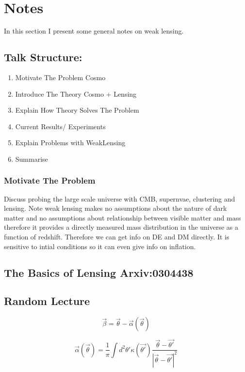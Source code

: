 \section{Notes}
In this section I present some general notes on weak lensing. 

\subsection{Talk Structure:}
\begin{enumerate}
    \item Motivate The Problem Cosmo
    \item Introduce The Theory Cosmo + Lensing
    \item Explain How Theory Solves The Problem
    \item Current Results/ Experiments
    \item Explain Problems with WeakLensing
    \item Summarise
\end{enumerate}

\subsubsection{Motivate The Problem}
Discuss probing the large scale universe with CMB, supernvae, clustering
and lensing. 
Note weak lensing makes no assumptions about the nature of dark matter
and no assumptions about relationship between visible matter and mass therefore
it provides a directly measured mass distribution in the universe as a function of 
redshift. Therefore we can get info on DE and DM directly. It is sensitive to intial
conditions so it can even give info on inflation. 

\subsection{The Basics of Lensing Arxiv:0304438}



\subsection{Random Lecture}
\begin{equation}
    \vec{\beta} = \vec{\theta} - \vec{\alpha}(\vec{\theta})
\end{equation}

\begin{equation}
  \vec{\alpha}(\vec{\theta}) = \frac{1}{\pi}  \int d^2\theta'  \kappa(\vec{\theta'}) \frac{\vec{\theta}-\vec{\theta'}}{|\vec{\theta}-\vec{\theta'}|^2}
\end{equation}

